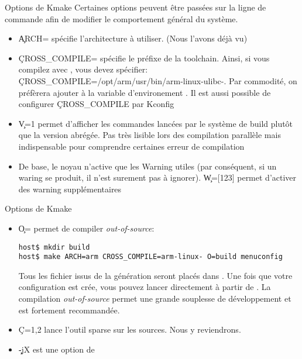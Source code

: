 \begin{frame}[fragile=singleslide]{Options de Kmake}
  Certaines options peuvent être passées sur la ligne de commande afin
  de modifier le comportement général du système.
  \begin{itemize}
  \item  \c{ARCH=} spécifie l'architecture  à utiliser.  (Nous l'avons
    déjà vu)
  \item \c{CROSS_COMPILE=} spécifie le préfixe de la toolchain. Ainsi,
    si vous  compilez avec ,
    vous                        devez                       spécifier:
    \c{CROSS_COMPILE=/opt/arm/usr/bin/arm-linux-ulibc-}.            Par
    commodité,  on  préfèrera   ajouter    à  la
    variable  d'environement  .  Il  est aussi  possible  de
    configurer \c{CROSS_COMPILE} par Kconfig
  \item \c{V=1} permet d'afficher les commandes lancées par le système
    de build plutôt que la  version abrégée. Pas très lisible lors des
    compilation parallèle mais indispensable pour comprendre certaines
    erreur de compilation
  \item  De  base, le  noyau  n'active  que  les Warning  utiles  (par
    conséquent,  si un  waring se  produit,  il n'est  surement pas  à
    ignorer).     \c{W=[123]}    permet    d'activer    des    warning
    supplémentaires
\end{itemize} 
\end{frame} 

\begin{frame}[fragile=singleslide]{Options de Kmake}
\begin{itemize} 
  \item \c{O=} permet de compiler \emph{out-of-source}:
    \begin{lstlisting}
host$ mkdir build
host$ make ARCH=arm CROSS_COMPILE=arm-linux- O=build menuconfig
    \end{lstlisting} %
    Tous  les  fichier  issus  de  la génération  seront  placés  dans
    .  Une fois  que  votre configuration  est crée,  vous
    pouvez lancer  directement  à partir de . La
    compilation  \emph{out-of-source} permet  une grande  souplesse de
    développement et est fortement recommandée.
  \item  \c{C={1,2}} lance  l'outil  sparse sur  les  sources. Nous  y
    reviendrons.
   \item \c{-jX} est une option de 
  \end{itemize} 
\end{frame}

